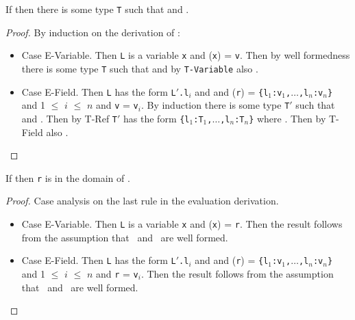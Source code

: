 \begin{Lemma}
\label{lem:valueImpliesType}
If \emph{} then there is some type {\tt T}
such that \emph{} and \emph{}.
\end{Lemma}
\begin{proof}
By induction on the derivation of :
\begin{itemize}
\item Case {\sc E-Variable}.  Then {\tt L} is a variable {\tt x} and 
  \Euid({\tt x}) = {\tt v}.  Then by
  well formedness there is some type {\tt T}
such that  and by {\tt T-Variable} also .
\item Case {\sc E-Field}.  Then {\tt L} has the form {\tt L$'$.l$_i$}
  and  and
  \texttt{\Huid}(\texttt{r}) =
  \texttt{\{l$_1$:v$_1$,$\ldots$,l$_n$:v$_n$\}} and
  1 $\leq$ $i$ $\leq$ $n$ and {\tt v} = {\tt v$_i$}.  By induction
  there is some type {\tt T$'$} such that
   and .
  Then by {\sc T-Ref} {\tt T$'$} has the form 
  \texttt{\{l$_1$:T$_1$,$\ldots$,l$_n$:T$_n$\}} where
.  Then by {\sc T-Field} also 
.
\end{itemize}
\end{proof}



\begin{Lemma}
\label{lem:refWellFormed}
If \emph{} then {\tt r} is in the domain of \Huid.
\end{Lemma}
\begin{proof}
Case analysis on the last rule in the evaluation derivation.
\begin{itemize}
\item Case {\sc E-Variable}.  Then {\tt L} is a variable {\tt x} and
  \Euid({\tt x}) = {\tt r}.  Then the result follows from the
  assumption that \Euid\ and \Huid\ are well formed.
\item Case {\sc E-Field}.  Then {\tt L} has the form {\tt L$'$.l$_i$}
  and  and
  \texttt{\Huid}(\texttt{r}) =
  \texttt{\{l$_1$:v$_1$,$\ldots$,l$_n$:v$_n$\}} and
  1 $\leq$ $i$ $\leq$ $n$ and {\tt r} = {\tt v$_i$}.  Then the result
  follows from the assumption that  \Euid\ and \Huid\ are well formed.
\end{itemize}
\end{proof}

